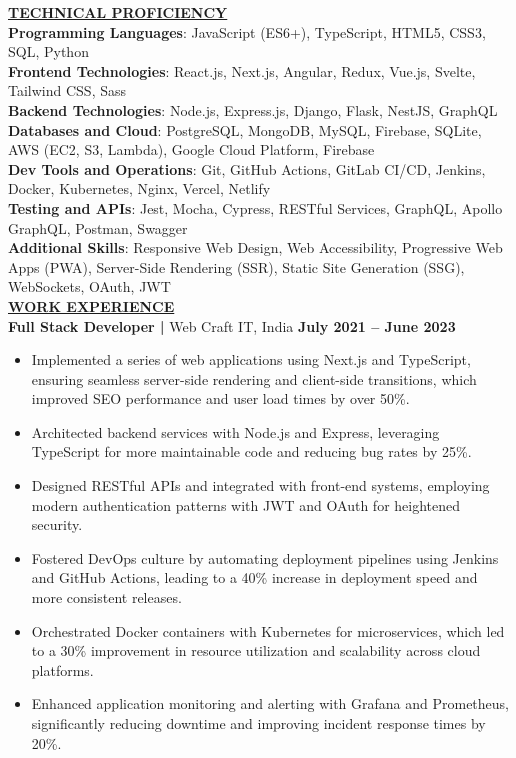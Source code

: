 \documentclass{article}
\begin{document}
\noindent \textbf{\underline{TECHNICAL PROFICIENCY}} \\
\textbf{Programming Languages}{: \small JavaScript (ES6+), TypeScript, HTML5, CSS3, SQL, Python} \\
\textbf{Frontend Technologies}{: \small React.js, Next.js, Angular, Redux, Vue.js, Svelte, Tailwind CSS, Sass} \\
\textbf{Backend Technologies}{: \small Node.js, Express.js, Django, Flask, NestJS, GraphQL} \\
\textbf{Databases and Cloud}{: \small PostgreSQL, MongoDB, MySQL, Firebase, SQLite, AWS (EC2, S3, Lambda), Google Cloud Platform, Firebase} \\
\textbf{Dev Tools and Operations}{: \small Git, GitHub Actions, GitLab CI/CD, Jenkins, Docker, Kubernetes, Nginx, Vercel, Netlify} \\
\textbf{Testing and APIs}{: \small Jest, Mocha, Cypress, RESTful Services, GraphQL, Apollo GraphQL, Postman, Swagger} \\
\textbf{Additional Skills}{: \small Responsive Web Design, Web Accessibility, Progressive Web Apps (PWA), Server-Side Rendering (SSR), Static Site Generation (SSG), WebSockets, OAuth, JWT} \\



\noindent \textbf{\underline{WORK EXPERIENCE}} \\
\noindent \textbf{Full Stack Developer | } Web Craft IT, India  \hfill \textbf{July 2021 – June 2023}
\begin{itemize}[noitemsep,nolistsep,leftmargin=*]
\item {\small Implemented a series of web applications using Next.js and TypeScript, ensuring seamless server-side rendering and client-side transitions, which improved SEO performance and user load times by over 50\%.}
\item {\small Architected backend services with Node.js and Express, leveraging TypeScript for more maintainable code and reducing bug rates by 25\%.}
\item {\small Designed RESTful APIs and integrated with front-end systems, employing modern authentication patterns with JWT and OAuth for heightened security.}
\item {\small Fostered DevOps culture by automating deployment pipelines using Jenkins and GitHub Actions, leading to a 40\% increase in deployment speed and more consistent releases.}
\item {\small Orchestrated Docker containers with Kubernetes for microservices, which led to a 30\% improvement in resource utilization and scalability across cloud platforms.}
\item {\small Enhanced application monitoring and alerting with Grafana and Prometheus, significantly reducing downtime and improving incident response times by 20\%.}
\end{itemize}
\end{document}
